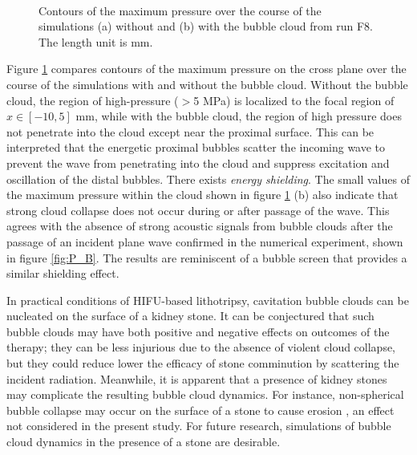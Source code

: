 \documentclass{jfm}
\begin{document}
\begin{figure}
  \center
  \\
  \caption{Contours of the maximum pressure over the course of the simulations (a) without and (b) with the bubble cloud from run F8. The length unit is mm.
   }
   \label{fig:cont_max} 
\end{figure}
Figure \ref{fig:cont_max} compares contours of the maximum pressure on the cross plane over the course of the simulations with and without the bubble cloud.
Without the bubble cloud, the region of high-pressure ($>$5 MPa) is localized to the focal region of $x\in[-10,5]$ mm, while with the bubble cloud, the region of high pressure does not penetrate into the cloud except near the proximal surface.
This can be interpreted that the energetic proximal bubbles scatter the incoming wave to prevent the wave from penetrating into the cloud and suppress excitation and oscillation of the distal bubbles. There exists {\it{energy shielding}}.
The small values of the maximum pressure within the cloud shown in figure \ref{fig:cont_max} (b) also indicate that strong cloud collapse does not occur during or after passage of the wave.
This agrees with the absence of strong acoustic signals from bubble clouds after the passage of an incident plane wave confirmed in the numerical experiment, shown in figure \ref{fig:P_B}.
The results are reminiscent of a bubble screen\citep{Carstensen47,Commander89} that provides a similar shielding effect.

In practical conditions of HIFU-based lithotripsy, cavitation bubble clouds can be nucleated on the surface of a kidney stone. It can be conjectured that such bubble clouds may have both positive and negative effects on outcomes of the therapy; they can be less injurious due to the absence of violent cloud collapse, but they could reduce lower the efficacy of stone comminution by scattering the incident radiation.
Meanwhile, it is apparent that a presence of kidney stones may complicate the resulting bubble cloud dynamics. For instance, non-spherical bubble collapse may occur on the surface of a stone to cause erosion \citep{Tomita86,Johnsen09}, an effect not considered in the present study. For future research, simulations of bubble cloud dynamics in the presence of a stone are desirable.
\end{document}
